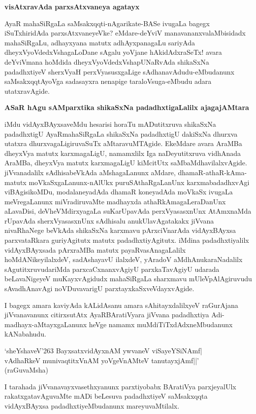 \noindent
\textbf{visAtxravAda parxsAtxvaneya agatayx}\label{page27}

AyaR mahaSiRgaLa saMsakxqqti-nAgarikate-BASe ivugaLa bagegx iSuTxhiridAda parxsAtxvaneyeVke? eMdare-deYviV manavananxvalaMbisidadx mahaSiRgaLu, adhayxyana matutx adhAyxpanagaLu sariyAda dheyxVyoVdedxVshagaLoDane sAgalu yoVjane hAkidAdxraSeTx! avara deYviVmana hoMdida dheyxVyoVdedxVshapUNaRvAda shikaSxNa padadhxtiyeV sherxVyaH perxVyasusxgaLige sAdhanavAdudu-eMbudanunx saMsakxqqtAyoVga sadasayxra nenapige taraloVsuga-eMbudu adara utatxravAgide.

\noindent
\textbf{ASaR hAgu sAMparxtika shikaSxNa padadhxtigaLalilx ajagajAMtara}\label{page28}

iMdu vidAyxBAyxsaveMdu hesarisi horaTu mADutitxruva shikaSxNa padadhxtigU AyaRmahaSiRgaLa shikaSxNa padadhxtigU dakiSxNa dhurxva utatxra dhurxvagaLigiruvaSuTx aMtaravuMTAgide. EkeMdare avara AraMBa dheyxVya matutx karxmagaLigU, namamxlilx Iga naDeyutitxruva vidhAnada AraMBa, dheyxVya matutx karxmagaLigU kiMcitUtx saMbaMdhavilalxvAgide. jiVvanadalilx sAdhisabeVkAda aMshagaLanunx aMdare, dhamaR-athaR-kAma-matutx moVkaSxgaLanunx-nAlUkx puruSAthaRgaLanUnx karxmabadadhxvAgi viBAgisikoMDu, modalaneyadAda dhamaR koneyadAda moVkaSx ivugaLa meVregaLanunx miVradiruvaMte madhayxda athaRkAmagaLeraDanUnx aLavaDisi, deVheVMdirxyagaLa suKarUpavAda perxVyasasxnUnx AtAmxnaMda rUpavAda sherxVyasasxnUnx sAdhisalu anukUlavAgatakakx jiVvana nivaRhaNege beVkAda shikaSxNa karxmavu pArxciVnarAda vidAyxBAyxsa parxvataRkara guriyAgitutx matutx padadhxtiyAgitutx. iMdina padadhxtiyalilx vidAyxBAyxsada pArxraMBa matutx payaRvasAnagaLalilx hoMdANikeyilalxdeV, sadAshayavU ilalxdeV, yAradoV aMdhAnukaraNadalilx sAgutitxruvudariMda parxcaCxnanxvAgiyU parxkaTavAgiyU udarada beLavaNigeyeV muKayxvAgidudx mahaSiRgaLa sharxmavu mUleVpAlAgiruvudu sAvadhAnavAgi noVDuvavarigU parxtayxkaSxveVdayxvAgide.

I bagegx amara kaviyAda kALidAsanu amara sAhitayxdalilxyeV raGurAjana jiVvanavanunx citirxsutAtx AyaRBAratiVyara jiVvana padadhxtiya Adi-madhayx-aMtayxgaLanunx heVge namamx muMdiTiTxdAdxneMbudanunx kANabahudu.

\begin{shloka}
`sheYshaveV\char'263 BayxsatxvidAyxnAM ywvaneV viSayeYSiNAmf|\\\label{28}
vAdhaRkeV munivaqtitxVnAM yoVgeVnAMteV tanutayxjAmf||'\\
\hfill (raGuvaMsha)
\end{shloka}

I tarahada jiVvanavayxvasethxyanunx parxtiyobabx BAratiVya parxjeyalUlx rakatxgatavAguvaMte mADi beLesuva padadhxtiyeV saMsakxqqta vidAyxBAyxsa padadhxtiyeMbudanunx mareyuvaMtilalx.

